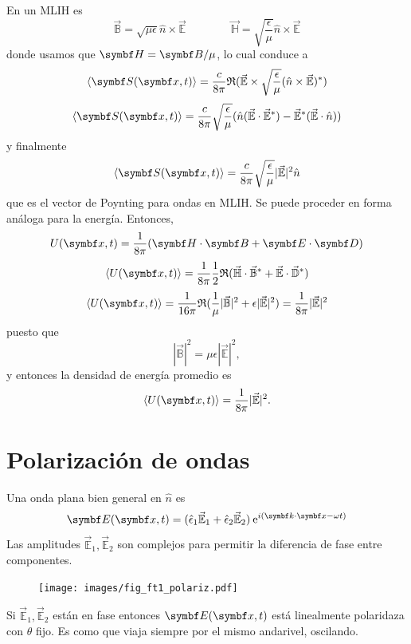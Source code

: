 \documentclass[10pt,oneside]{CBFT_book}
\begin{document}
En un MLIH es 
\[
	\vec{\mathbb{B}} = \sqrt{ \mu \epsilon } \hat{n} \times \vec{\mathbb{E}} \qquad\qquad 
	\vec{\mathbb{H}} = \sqrt{ \frac{\epsilon}{\mu } } \hat{n} \times \vec{\mathbb{E}}
\]
donde usamos que $\vb{H} = \vb{B}/\mu$, lo cual conduce a
\[
	\langle \vb{S}( \vb{x},t ) \rangle = \frac{c}{8\pi} \re( \vec{\mathbb{E}} \times 
		\sqrt{\frac{\epsilon}{\mu}}(\hat{n} \times \vec{\mathbb{E}})^* )
\]
\[
	\langle \vb{S}( \vb{x},t ) \rangle = \frac{c}{8\pi} \sqrt{\frac{\epsilon}{\mu}} 
		( \hat{n} (\vec{\mathbb{E}}\cdot\vec{\mathbb{E}}^*) - 
		\vec{\mathbb{E}}^*(\vec{\mathbb{E}}\cdot\hat{n}) )
\]
y finalmente
\[
	\langle \vb{S}( \vb{x},t ) \rangle = \frac{c}{8\pi} 
		\sqrt{\frac{\epsilon}{\mu}}|\vec{\mathbb{E}}|^2 \hat{n}
\]
que es el vector de Poynting para ondas en MLIH.
Se puede proceder en forma análoga para la energía. Entonces,
\[
	U(\vb{x},t) = \frac{1}{8\pi}( \pe{H}{B} + \pe{E}{D} )
\]
\[
	\langle U(\vb{x},t) \rangle = \frac{1}{8\pi} \frac{1}{2} \re ( 
	\vec{\mathbb{H}}\cdot\vec{\mathbb{B}}^* + \vec{\mathbb{E}}\cdot\vec{\mathbb{D}}^* )
\]
\[
	\langle U(\vb{x},t) \rangle = \frac{1}{16\pi}
		\re ( \frac{1}{\mu} |\vec{\mathbb{B}}|^2 + \epsilon |\vec{\mathbb{E}}|^2 ) =
		\frac{1}{8\pi} |\vec{\mathbb{E}}|^2
\]
puesto que 
\[
	|\vec{\mathbb{B}}|^2 = \mu\epsilon |\vec{\mathbb{E}}|^2,	
\]
y entonces la densidad de energía promedio es
\[
		\langle U(\vb{x},t) \rangle = \frac{1}{8\pi} |\vec{\mathbb{E}}|^2.
\]

\section{Polarización de ondas}

Una onda plana bien general en $\hat{n}$ es 
\[
	\vb{E}( \vb{x},t )=(\hat{\epsilon}_1 \vec{\mathbb{E}}_1 + 
			\hat{\epsilon}_2\vec{\mathbb{E}}_2) \euler^{i( \pe{k}{x} -\omega t)}
\]
Las amplitudes $\vec{\mathbb{E}}_1,\vec{\mathbb{E}}_2$ son complejos para permitir la diferencia 
de fase entre componentes.

\begin{figure}[htb]
	\begin{center}
	\texttt{[image: images/fig\_ft1\_polariz.pdf]} 
	\end{center}
	\caption{}
\end{figure} 

Si $\vec{\mathbb{E}}_1,\vec{\mathbb{E}}_2$ están en fase entonces $\vb{E}( \vb{x},t )$ está linealmente
polaridaza con $\theta$ fijo. Es como que  viaja siempre por el mismo andarivel, oscilando. 
\end{document}
